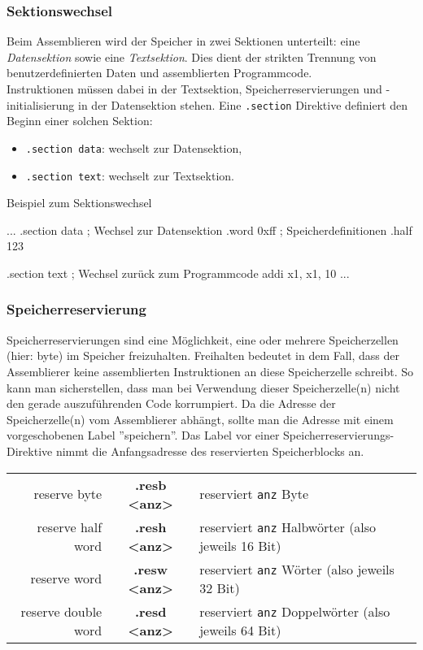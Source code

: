 \subsubsection{Sektionswechsel}

Beim Assemblieren wird der Speicher in zwei Sektionen unterteilt: eine
\emph{Datensektion} sowie eine \emph{Textsektion}. Dies dient der strikten
Trennung von benutzerdefinierten Daten und assemblierten Programmcode.\\

Instruktionen müssen dabei in der Textsektion, Speicherreservierungen und
-initialisierung in der Datensektion stehen. Eine \texttt{.section} Direktive
definiert den Beginn einer solchen Sektion:

\begin{itemize}
  \item \texttt{.section data}: wechselt zur Datensektion,
  \item \texttt{.section text}: wechselt zur Textsektion.
\end{itemize}

\begin{exampleblock}{Beispiel zum Sektionswechsel}
	\begin{riscv}
	...
	.section data ; Wechsel zur Datensektion
	.word 0xff ; Speicherdefinitionen
	.half 123

	.section text ; Wechsel zurück zum Programmcode
	addi x1, x1, 10
	...
  \end{riscv}
\end{exampleblock}

\subsubsection{Speicherreservierung}
Speicherreservierungen sind eine Möglichkeit, eine oder mehrere Speicherzellen
(hier: byte) im Speicher freizuhalten. Freihalten bedeutet in dem Fall, dass der
Assemblierer keine assemblierten Instruktionen an diese Speicherzelle schreibt.
So kann man sicherstellen, dass man bei Verwendung dieser Speicherzelle(n) nicht
den gerade auszuführenden Code korrumpiert. Da die Adresse der Speicherzelle(n)
vom Assemblierer abhängt, sollte man die Adresse mit einem vorgeschobenen Label
''speichern''. Das Label vor einer Speicherreservierungs-Direktive nimmt die
Anfangsadresse des reservierten Speicherblocks an.\\

\begin{centering}
	\begin{tabular}{rcl}
		reserve byte & \textbf{.resb <anz>} & reserviert \texttt{anz} Byte\\
		reserve half word & \textbf{.resh <anz>} & reserviert \texttt{anz} Halbwörter (also jeweils 16 Bit)\\
		reserve word & \textbf{.resw <anz>} & reserviert \texttt{anz} Wörter (also jeweils 32 Bit)\\
		reserve double word & \textbf{.resd <anz>} & reserviert \texttt{anz} Doppelwörter (also jeweils 64 Bit)\\
	\end{tabular}
\end{centering}

